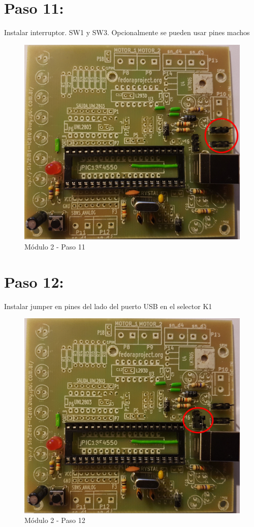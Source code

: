 \newpage

\section{Paso 11:}

Instalar interruptor. SW1 y SW3. Opcionalmente se pueden usar pines machos

\begin{figure}[h]
	\centering
	\includegraphics[width=0.8\linewidth]{Modulo_2/M2_11}
	\caption{Módulo 2 - Paso 11}
	\label{fig:M2_11}
\end{figure}

\newpage

\section{Paso 12:}

Instalar jumper en pines del lado del puerto USB en el selector K1

\begin{figure}[h]
	\centering
	\includegraphics[width=0.8\linewidth]{Modulo_2/M2_12}
	\caption{Módulo 2 - Paso 12}
	\label{fig:M2_12}
\end{figure}

